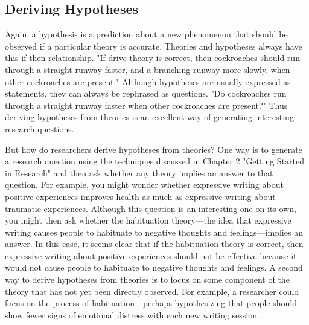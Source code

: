 \subsection{Deriving Hypotheses}

Again, a hypothesis is a prediction about a new phenomenon that should be observed if a particular theory is accurate. Theories and hypotheses always have this if-then relationship. "If drive theory is correct, then cockroaches should run through a straight runway faster, and a branching runway more slowly, when other cockroaches are present." Although hypotheses are usually expressed as statements, they can always be rephrased as questions. "Do cockroaches run through a straight runway faster when other cockroaches are present?" Thus deriving hypotheses from theories is an excellent way of generating interesting research questions.

But how do researchers derive hypotheses from theories? One way is to generate a research question using the techniques discussed in Chapter 2 "Getting Started in Research" and then ask whether any theory implies an answer to that question. For example, you might wonder whether expressive writing about positive experiences improves health as much as expressive writing about traumatic experiences. Although this question is an interesting one on its own, you might then ask whether the habituation theory---the idea that expressive writing causes people to habituate to negative thoughts and feelings---implies an answer. In this case, it seems clear that if the habituation theory is correct, then expressive writing about positive experiences should not be effective because it would not cause people to habituate to negative thoughts and feelings. A second way to derive hypotheses from theories is to focus on some component of the theory that has not yet been directly observed. For example, a researcher could focus on the process of habituation---perhaps hypothesizing that people should show fewer signs of emotional distress with each new writing session.

